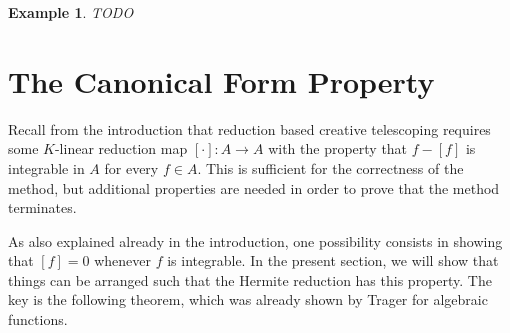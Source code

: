 \documentclass{sig-alternate}
\newtheorem{example}[theorem]{Example}
\begin{document}
\begin{example}
TODO
\end{example}

\section{The Canonical Form Property}

Recall from the introduction that reduction based creative telescoping requires
some $K$-linear reduction map $[\cdot]\colon A\to A$ with the property that
$f-[f]$ is integrable in $A$ for every $f\in A$. This is sufficient for the
correctness of the method, but additional properties are needed in order to
prove that the method terminates.

As also explained already in the introduction, one possibility consists in
showing that $[f]=0$ whenever $f$ is integrable. In the present section,
we will show that things can be arranged such that the Hermite reduction
has this property. The key is the following theorem, which was already shown
by Trager for algebraic functions.
\end{document}

